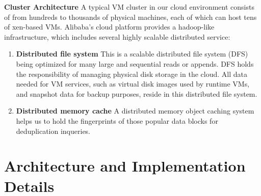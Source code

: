 {%
{\bf Cluster Architecture}
A typical VM cluster in our cloud environment
consists of from hundreds to thousands of physical machines, each of which can
host tens of xen-based\cite{Barham2003} VMs.
Alibaba's cloud platform provides a hadoop-like infrastructure, 
which includes several highly scalable distributed service:
\begin{enumerate}
\item {\bf Distributed file system} This is a scalable distributed file system (DFS) being optimized for many large and sequential reads or appends. DFS holds the responsibility of managing physical disk storage
in the cloud. All data needed for VM services, such as virtual disk images used by runtime VMs,
and snapshot data for backup purposes, reside in this distributed file system. 
\item {\bf Distributed memory cache} A distributed memory object caching system helps us to hold the fingerprints of those popular data blocks for deduplication inqueries. 
\end{enumerate}
}

\section{Architecture and Implementation Details}
\label{sec:arch}



